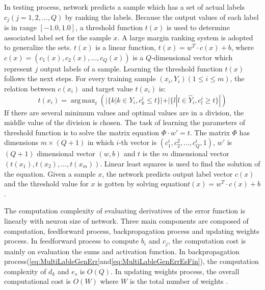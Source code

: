 In testing process, network predicts a sample which has a set of actual labels $c_{j} (j = 1,2,...,Q)$ by ranking the labels. Because the output values of each label is in range $[-1.0,1.0]$, a threshold function $t(x)$ is used to determine associated label set for the sample $x$. A large margin ranking system\citep{elisseeff2001kernel} is adopted to generalize the sets. $t(x)$ is a linear function, $t(x) = w^T\cdot c(x) + b$, where $c(x) = (c_{1}(x), c_{2}(x),...,c_{Q}(x))$ is a $Q$-dimensional vector which represent $j$ output labels of a sample. Learning the threshold function $t(x)$ follows the next steps. For every training sample $(x_{i}, Y_{i}) (1 \leq i \leq m)$, the relation between $c(x_{i})$ and target value $t(x_{i})$ is:
\begin{equation}\label{eq:MultiLableThreshFunc}
t(x_{i}) =  \operatorname{arg\,max}_t (|\{k|k \in Y_{i}, c_{k}^i \leq t\}| + |\{l|l \in \hat{Y}_{i}, c_{l}^i \geq t\}|) 
\end{equation}
If there are several minimum values and optimal values are in a division, the middle value of the division is chosen. The task of learning the parameters of threshold function is to solve the matrix equation $\Phi \cdot w' = t$. The matrix $\Phi$ has dimensions $m \times (Q + 1)$ in which $i$-th vector is $(c_{1}^i, c_{2}^2,...,c_{Q}^i,1)$, $w'$ is $(Q+1)$ dimensional vector $(w,b)$ and $t$ is the $m$ dimensional vector $(t(x_{1}), t(x_{2}),...,t(x_{m}))$. Linear least squares is used to find the solution of the equation. Given a sample $x$, the network predicts output label vector $c(x)$ and the threshold value for $x$ is gotten by solving equation$t(x) = w^T \cdot c(x) + b$.

The computation complexity of evaluating derivatives of the error function is linearly with neuron size of network. Three main components are composed of computation, feedforward process, backpropagation process and updating weights process. In feedforward process to compute $b_{i}$ and $c_{j}$, the computation cost is mainly on evaluation the sums and activation function. In backpropagation process(\ref{eq:MultiLableGenErr}and\ref{eq:MultiLableGenErrEsFin}), the computation complexity of $d_{k}$ and $e_{s}$ is $O(Q)$. In updating weights process, the overall computational cost is $O(W)$ where $W$ is the total number of weights . 

